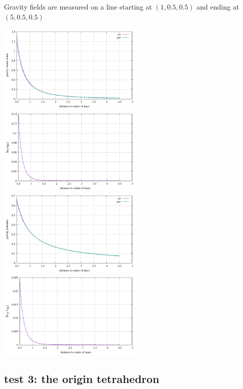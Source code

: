 Gravity fields are measured on a line starting at $(1,0.5,0.5)$ and ending at $(5,0.5,0.5)$
\begin{center}
\includegraphics[width=7cm]{python_codes/fieldstone_113/results/test2/g_vector.pdf}
\includegraphics[width=7cm]{python_codes/fieldstone_113/results/test2/g_vector_diff.pdf}\\
\includegraphics[width=7cm]{python_codes/fieldstone_113/results/test2/g_pot.pdf}
\includegraphics[width=7cm]{python_codes/fieldstone_113/results/test2/g_pot_diff.pdf}
\end{center}





\subsection*{test 3: the origin tetrahedron}

